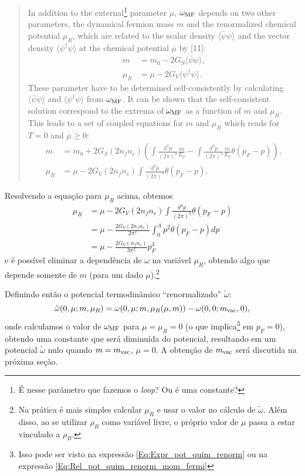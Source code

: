 \begin{quote}
	In addition to the external\footnote{É nesse parâmetro que fazemos o \emph{loop}? Ou é uma constante?} parameter $\mu$, $\omega_{\rm{MF}}$ depends on two other parameters, the dynamical fermion mass $m$ and the renormalized chemical potential $\mu_R$, which are related to the scalar density $\langle\bar{\psi}\psi\rangle$ and the vector density $\langle\psi^\dagger\psi\rangle$ at the chemical potential $\mu$ by [11]:
	\begin{align}
		m &= m_0 - 2G_S\langle\bar{\psi}\psi\rangle, \label{Eq:Eq_Gap_Buballa_1}\\
		\mu_R &= \mu - 2G_V\langle\psi^\dagger\psi\rangle. \label{Eq:Eq_Gap_Pot_Quim_Renorm}
	\end{align}
	These parameter have to be determined self-consistently by calculating $\langle\bar{\psi}\psi\rangle$ and $\langle\psi^\dagger\psi\rangle$ from $\omega_{\rm{MF}}$. It can be shown that the self-consistent solution correspond to the extrema of $\omega_{\rm{MF}}$ as a function of $m$ and $\mu_R$. This leads to a set of coupled equations for $m$ and $\mu_R$ which reads for $T = 0$ and $\mu \geqslant 0$:
\begin{align}
	m &= m_0 + 2G_S(2n_fn_c)\left(\int \frac{d^3p}{(2\pi)^3} \frac{m}{E_p} - \int \frac{d^3p}{(2\pi)^3}\frac{m}{E_p}\theta(p_F - p)\right), \label{Eq:Eq_Gap_Buballa_2}\\
	\mu_R &= \mu - 2G_V(2n_fn_c)\int\frac{d^3p}{(2\pi)^3}\theta(p_F - p).
\end{align}
\end{quote}

Resolvendo a equação para $\mu_R$ acima, obtemos
\begin{align}
	\mu_R &= \mu - 2G_V(2n_fn_c)\int\frac{d^3p}{(2\pi)^3}\theta(p_F - p) \\
	&= \mu - \frac{2G_V(2n_fn_c)}{2\pi^2}\int_0^\Lambda p^2 \theta(p_F - p) dp \\
	&= \mu - \frac{2G_V(n_fn_c)}{3\pi^2}p_F^3 \label{Eq:Expr_pot_quim_renorm}
\end{align}
%
e é possível eliminar a dependência de $\omega$ na variável $\mu_R$, obtendo algo que depende somente de $m$ (para um dado $\mu$).\footnote{Na prática é mais simples calcular $\mu_R$ e usar o valor no cálculo de $\tilde{\omega}$. Além disso, ao se utilizar $\rho_B$ como variável livre, o próprio valor de $\mu$ passa a estar vinculado a $\rho_B$.}

Definindo então o potencial termodinâmico ``renormalizado'' $\tilde\omega$:
\begin{equation}\label{Eq:Def_omega_tilde}
	\tilde{\omega}(0,\mu;m,\mu_R) = \omega(0,\mu; m, \mu_R(\mu,m)) - \omega(0,0; m_{\rm{vac}}, 0),
\end{equation}
%
onde calculamos o valor de $\omega_{\rm{MF}}$ para $\mu = \mu_R = 0$ (o que implica\footnote{Isso pode ser visto na expressão \eqref{Eq:Expr_pot_quim_renorm} ou na expressão \eqref{Eq:Rel_pot_quim_renorm_mom_fermi}} em $p_F = 0$), obtendo uma constante que será diminuída do potencial, resultando em um potencial $\tilde\omega$ nulo quando $m = m_{\rm{vac}}$, $\mu = 0$. A obtenção de $m_{\rm{vac}}$ será discutida na próxima seção.

